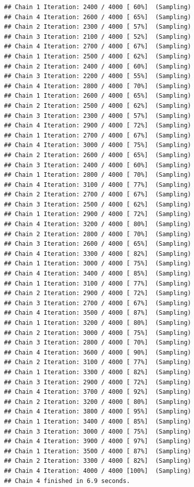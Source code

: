 \documentclass[
]{article}
\begin{document}
\begin{verbatim}
## Chain 1 Iteration: 2400 / 4000 [ 60%]  (Sampling) 
## Chain 4 Iteration: 2600 / 4000 [ 65%]  (Sampling) 
## Chain 2 Iteration: 2300 / 4000 [ 57%]  (Sampling) 
## Chain 3 Iteration: 2100 / 4000 [ 52%]  (Sampling) 
## Chain 4 Iteration: 2700 / 4000 [ 67%]  (Sampling) 
## Chain 1 Iteration: 2500 / 4000 [ 62%]  (Sampling) 
## Chain 2 Iteration: 2400 / 4000 [ 60%]  (Sampling) 
## Chain 3 Iteration: 2200 / 4000 [ 55%]  (Sampling) 
## Chain 4 Iteration: 2800 / 4000 [ 70%]  (Sampling) 
## Chain 1 Iteration: 2600 / 4000 [ 65%]  (Sampling) 
## Chain 2 Iteration: 2500 / 4000 [ 62%]  (Sampling) 
## Chain 3 Iteration: 2300 / 4000 [ 57%]  (Sampling) 
## Chain 4 Iteration: 2900 / 4000 [ 72%]  (Sampling) 
## Chain 1 Iteration: 2700 / 4000 [ 67%]  (Sampling) 
## Chain 4 Iteration: 3000 / 4000 [ 75%]  (Sampling) 
## Chain 2 Iteration: 2600 / 4000 [ 65%]  (Sampling) 
## Chain 3 Iteration: 2400 / 4000 [ 60%]  (Sampling) 
## Chain 1 Iteration: 2800 / 4000 [ 70%]  (Sampling) 
## Chain 4 Iteration: 3100 / 4000 [ 77%]  (Sampling) 
## Chain 2 Iteration: 2700 / 4000 [ 67%]  (Sampling) 
## Chain 3 Iteration: 2500 / 4000 [ 62%]  (Sampling) 
## Chain 1 Iteration: 2900 / 4000 [ 72%]  (Sampling) 
## Chain 4 Iteration: 3200 / 4000 [ 80%]  (Sampling) 
## Chain 2 Iteration: 2800 / 4000 [ 70%]  (Sampling) 
## Chain 3 Iteration: 2600 / 4000 [ 65%]  (Sampling) 
## Chain 4 Iteration: 3300 / 4000 [ 82%]  (Sampling) 
## Chain 1 Iteration: 3000 / 4000 [ 75%]  (Sampling) 
## Chain 4 Iteration: 3400 / 4000 [ 85%]  (Sampling) 
## Chain 1 Iteration: 3100 / 4000 [ 77%]  (Sampling) 
## Chain 2 Iteration: 2900 / 4000 [ 72%]  (Sampling) 
## Chain 3 Iteration: 2700 / 4000 [ 67%]  (Sampling) 
## Chain 4 Iteration: 3500 / 4000 [ 87%]  (Sampling) 
## Chain 1 Iteration: 3200 / 4000 [ 80%]  (Sampling) 
## Chain 2 Iteration: 3000 / 4000 [ 75%]  (Sampling) 
## Chain 3 Iteration: 2800 / 4000 [ 70%]  (Sampling) 
## Chain 4 Iteration: 3600 / 4000 [ 90%]  (Sampling) 
## Chain 2 Iteration: 3100 / 4000 [ 77%]  (Sampling) 
## Chain 1 Iteration: 3300 / 4000 [ 82%]  (Sampling) 
## Chain 3 Iteration: 2900 / 4000 [ 72%]  (Sampling) 
## Chain 4 Iteration: 3700 / 4000 [ 92%]  (Sampling) 
## Chain 2 Iteration: 3200 / 4000 [ 80%]  (Sampling) 
## Chain 4 Iteration: 3800 / 4000 [ 95%]  (Sampling) 
## Chain 1 Iteration: 3400 / 4000 [ 85%]  (Sampling) 
## Chain 3 Iteration: 3000 / 4000 [ 75%]  (Sampling) 
## Chain 4 Iteration: 3900 / 4000 [ 97%]  (Sampling) 
## Chain 1 Iteration: 3500 / 4000 [ 87%]  (Sampling) 
## Chain 2 Iteration: 3300 / 4000 [ 82%]  (Sampling) 
## Chain 4 Iteration: 4000 / 4000 [100%]  (Sampling) 
## Chain 4 finished in 6.9 seconds.

\end{verbatim}
\end{document}
